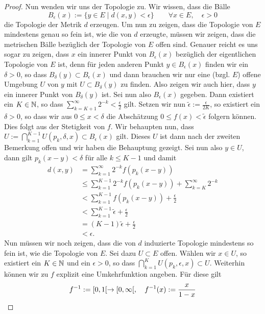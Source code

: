 \begin{proof}
  Nun wenden wir uns der Topologie zu. Wir wissen, dass die Bälle
  \[
  B_\epsilon(x) := \{ y \in E \mid d(x,y) < \epsilon \} \qquad \forall
  x \in E, \quad \epsilon > 0
  \]
  die Topologie der Metrik $d$ erzeugen. Um nun zu zeigen, dass die
  Topologie von $E$ mindestens genau so fein ist, wie die von $d$
  erzeugte, müssen wir zeigen, dass die metrischen Bälle bezüglich der
  Topologie von $E$ offen sind. Genauer reicht es uns sogar
  zu zeigen, dass $x$ ein innerer Punkt von $B_\epsilon(x)$ bezüglich
  der eigentlichen Topologie von $E$ ist, denn
  für jeden anderen Punkt $y \in B_\epsilon(x)$ finden wir ein
  $\delta >0$, so dass $B_\delta(y) \subset B_\epsilon(x)$ und dann
  brauchen wir nur eine (bzgl. $E$) offene Umgebung $U$ von $y$ mit $U
  \subset B_\delta(y)$ zu finden. Also zeigen wir auch hier, dass $y$
  ein innerer Punkt von $B_\delta(y)$ ist. Sei nun also
  $B_\epsilon(x)$ gegeben. Dann existiert ein $K \in \mathbb{N}$, so dass
  $\sum_{k=K+1}^\infty 2^{-k} < \frac{\epsilon}{2}$ gilt. Setzen wir
  nun $\tilde \epsilon := \frac{\epsilon}{2K}$, so  existiert ein
  $\delta > 0$, so dass wir aus $0 \leq x < \delta$ die Abschätzung $0
  \leq f(x) < \tilde \epsilon$ folgern können. Dies folgt aus der
  Stetigkeit von $f$. Wir behaupten nun, dass
  $U := \bigcap_{k=1}^{K-1} U(p_k, \delta, x) \subset B_\epsilon(x)$
  gilt. Dieses $U$ ist dann nach der zweiten Bemerkung offen und wir
  haben die Behauptung gezeigt. Sei nun also $y \in U$, dann gilt
  $p_k(x-y) < \delta$ für alle $k \leq K-1$ und damit
  \begin{align*}
    d(x,y) & = \sum_{k=1}^\infty 2^{-k} f(p_k(x-y)) \\
    & \leq \sum_{k=1}^{K-1}2^{-k} f(p_k(x-y)) + \sum_{k=K}^\infty 2^{-k} \\
    & < \sum_{k=1}^{K-1} f(p_k(x-y)) + \frac{\epsilon}{2} \\
    & < \sum_{k=1}^{K-1} \tilde \epsilon + \frac{\epsilon}{2} \\
    & = (K-1) \tilde \epsilon + \frac{\epsilon}{2}\\
    & < \epsilon.
  \end{align*}
  Nun müssen wir noch zeigen, dass die von $d$ induzierte Topologie
  mindestens so fein ist, wie die Topologie von $E$. Sei dazu $U \subset
  E$ offen. Wählen wir $x \in U$, so existiert ein $K \in \mathbb{N}$ und ein
  $\epsilon > 0$, so dass $\bigcap_{k=1}^K U(p_k, \epsilon, x) \subset
  U$. Weiterhin können wir zu $f$ explizit eine Umkehrfunktion
  angeben. Für diese gilt
  \[
  f^{-1} := [0, 1[\rightarrow [0, \infty[, \quad f^{-1}(x) := \frac{x}{1-x}
\]
\end{proof}
